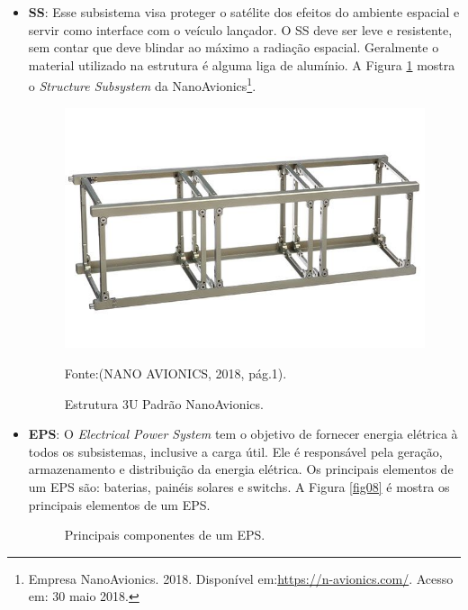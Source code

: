\begin{itemize}

	\item \textbf{SS}: Esse subsistema visa proteger o satélite dos efeitos do ambiente espacial e servir como interface com o veículo lançador. O SS deve ser leve e resistente, sem contar que deve blindar ao máximo a radiação espacial. Geralmente o material utilizado na estrutura é alguma liga de alumínio.  A Figura \ref{fig07} mostra o \textit{Structure Subsystem} da NanoAvionics\footnote{Empresa NanoAvionics. 2018. Disponível em:\url{https://n-avionics.com/}. Acesso em: 30 maio 2018.}.

\begin{figure}[h]
	\centering
    \caption{Estrutura 3U Padrão NanoAvionics.}
    
	\includegraphics[keepaspectratio=true,scale=0.45]{figuras/cubesat-structure-main.jpg}
	
	Fonte:(NANO AVIONICS, 2018, pág.1).\linebreak
	
	\label{fig07}
\end{figure}

\newpage
	\item \textbf{EPS}: O \textit{Electrical Power System} tem o objetivo de fornecer energia elétrica à todos os subsistemas, inclusive a carga útil. Ele é responsável pela geração, armazenamento e distribuição da energia elétrica. Os principais elementos de um EPS são: baterias, painéis solares e switchs. A Figura \ref{fig08} é mostra os principais elementos de um EPS.
    
\begin{figure}[h]
	\centering
    \caption{Principais componentes de um EPS.}
	

\end{figure}
\end{itemize}
